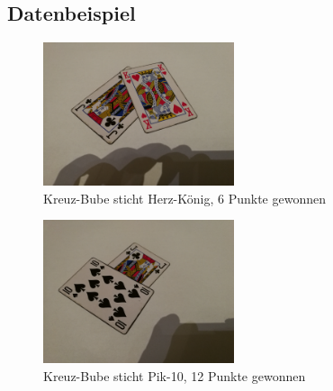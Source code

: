 \documentclass[paper=A4, deutsch]{scrartcl}
\begin{document}
\subsection{Datenbeispiel}
\begin{figure}[h!]
 \centering
 \includegraphics[width=0.5\textwidth]{datenbeispiel.jpg}
 \caption{Kreuz-Bube sticht Herz-König, 6 Punkte gewonnen}
 \label{fig:img}
\end{figure}
\begin{figure}[h!]
 \centering
 \includegraphics[width=0.5\textwidth]{datenbeispiel2.jpg}
 \caption{Kreuz-Bube sticht Pik-10, 12 Punkte gewonnen}
 \label{fig:img}
\end{figure}

\newpage
\end{document}
